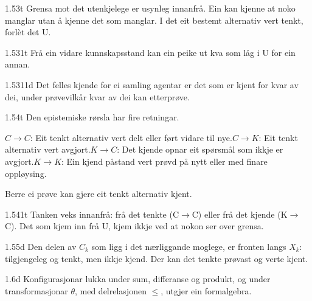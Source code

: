 \begin{formproposition}{1.53}{t}
Grensa mot det utenkjelege er usynleg innanfrå. Ein kan kjenne at noko manglar utan å kjenne det som manglar. I det eit bestemt alternativ vert tenkt, forlèt det U.
\end{formproposition}

\begin{formproposition}{1.531}{t}
Frå ein vidare kunnskapsstand kan ein peike ut kva som låg i U for ein annan.
\end{formproposition}

\begin{formproposition}{1.5311}{d}
Det felles kjende for ei samling agentar er det som er kjent for kvar av dei, under prøvevilkår kvar av dei kan etterprøve.
\end{formproposition}

\begin{formproposition}{1.54}{t}
Den epistemiske rørsla har fire retningar.

\(C\to C\): Eit tenkt alternativ vert delt eller ført vidare til nye.\newline{}\(C\to K\): Eit tenkt alternativ vert avgjort.\newline{}\(K\to C\): Det kjende opnar eit spørsmål som ikkje er avgjort.\newline{}\(K\to K\): Ein kjend påstand vert prøvd på nytt eller med finare oppløysing.

Berre ei prøve kan gjere eit tenkt alternativ kjent.
\end{formproposition}

\begin{formproposition}{1.541}{t}
Tanken veks innanfrå: frå det tenkte (C\(→\)C) eller frå det kjende (K\(→\)C). Det som kjem inn frå U, kjem ikkje ved at nokon ser over grensa.
\end{formproposition}

\begin{formproposition}{1.55}{d}
Den delen av \(C_k\) som ligg i det nærliggande moglege, er fronten langs \(X_k\): tilgjengeleg og tenkt, men ikkje kjend. Der kan det tenkte prøvast og verte kjent.
\end{formproposition}

\begin{formproposition}{1.6}{d}
Konfigurasjonar lukka under sum, differanse og produkt, og under transformasjonar \(θ\), med delrelasjonen \(≤\), utgjer ein formalgebra.
\end{formproposition}

